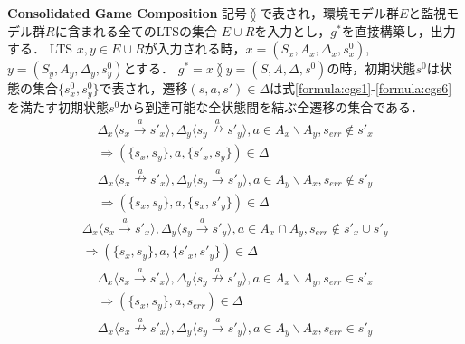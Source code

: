 \begin{dfn}{\textbf{Consolidated Game Composition}}
\label{def:consolidated_game_composition}
    記号$\between$で表され，環境モデル群$E$と監視モデル群$R$に含まれる全てのLTSの集合 $E \cup R$を入力とし，$g^*$を直接構築し，出力する．
    LTS $x,y \in E \cup R$が入力される時，$x = (S_{x}, A_{x}, \Delta_{x}, s^0_{x})$,
    $y = (S_{y}, A_{y}, \Delta_{y}, s^0_{y})$とする．
    $g^* = x \between y = (S, A, \Delta, s^0)$の時，初期状態$s^0$は状態の集合$\{ s^0_{x}, s^0_{y} \}$で表され，遷移$(s,a,s')\in\Delta$は式\ref{formula:cgs1}-\ref{formula:cgs6}を満たす初期状態$s^0$から到達可能な全状態間を結ぶ全遷移の集合である．
    \begin{multline}
    \label{formula:cgs1}
    \Delta_x \langle s_{x} \overset{a}{\rightarrow} s'_{x} \rangle, \Delta_y \langle s_{y} \overset{a}{\nrightarrow} s'_{y} \rangle, a \in A_{x} \backslash A_{y}, s_{err} \notin s'_{x}\\
    \Rightarrow (\{ s_{x},s_{y} \},a,\{ s'_{x},s_{y} \} ) \in \Delta
    \end{multline}
    \begin{multline}
    \label{formula:cgs2}
    \Delta_x \langle s_{x} \overset{a}{\nrightarrow} s'_{x} \rangle, \Delta_y \langle s_{y} \overset{a}{\rightarrow} s'_{y} \rangle, a \in A_{y} \backslash A_{x}, s_{err} \notin s'_{y}\\
    \Rightarrow (\{ s_{x},s_{y} \},a,\{ s_{x},s'_{y} \}) \in \Delta
    \end{multline}
    \begin{multline}
    \label{formula:cgs3}
    \Delta_x \langle s_{x} \overset{a}{\rightarrow} s'_{x} \rangle, \Delta_y \langle s_{y} \overset{a}{\rightarrow} s'_{y} \rangle, a \in A_{x} \cap A_{y}, s_{err} \notin s'_{x} \cup s'_{y}\\
    \Rightarrow (\{ s_{x},s_{y} \},a,\{ s'_{x},s'_{y} \}) \in \Delta
    \end{multline}
    \begin{multline}
    \label{formula:cgs4}
    \Delta_x \langle s_{x} \overset{a}{\rightarrow} s'_{x} \rangle, \Delta_y \langle s_{y} \overset{a}{\nrightarrow} s'_{y} \rangle, a \in A_{x} \backslash A_{y}, s_{err} \in s'_{x}\\
    \Rightarrow (\{ s_{x},s_{y} \},a,s_{err}) \in \Delta
    \end{multline}
    \begin{multline}
    \label{formula:cgs5}
    \Delta_x \langle s_{x} \overset{a}{\nrightarrow} s'_{x} \rangle, \Delta_y \langle s_{y} \overset{a}{\rightarrow} s'_{y} \rangle, a \in A_{y} \backslash A_{x}, s_{err} \in s'_{y}\\

\end{multline}
\end{dfn}
